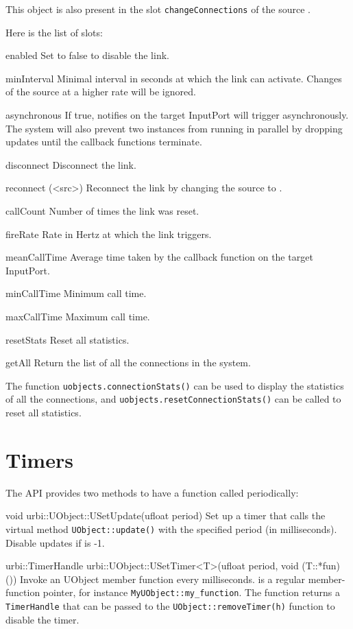 This object is also present in the slot \lstinline|changeConnections| of the
source \UVar.

Here is the list of  slots:

\begin{urbiscriptapi}
\item[enabled]
  Set to false to disable the link.
\item[minInterval]
  Minimal interval in seconds at which the link can activate. Changes of the
  source at a higher rate will be ignored.
\item[asynchronous]
  If true, notifies on the target InputPort will trigger asynchronously. The
  system will also prevent two instances from running in parallel by dropping
  updates until the callback functions terminate.
\item[disconnect]
  Disconnect the link.
\item[reconnect](<src>)
  Reconnect the link by changing the source to .
\item[callCount]
  Number of times the link was reset.
\item[fireRate]
  Rate in Hertz at which the link triggers.
\item[meanCallTime]
  Average time taken by the callback function on the target InputPort.
\item[minCallTime]
  Minimum call time.
\item[maxCallTime]
  Maximum call time.
\item[resetStats]
  Reset all statistics.
\item[getAll]
  Return the list of all the connections in the system.
\end{urbiscriptapi}


The function \lstinline|uobjects.connectionStats()| can be used to display
the statistics of all the connections, and
\lstinline|uobjects.resetConnectionStats()| can be called to reset all
statistics.

\section{Timers}
\label{sec:uob:timers}

The API provides two methods to have a function called periodically:
\begin{cxxapi}
\item[void urbi::UObject::USetUpdate(ufloat period)]
  Set up a timer that calls the virtual method
  \lstinline{UObject::update()} with the specified period (in
  milliseconds).  Disable updates if  is -1.

\item[urbi::TimerHandle urbi::UObject::USetTimer<T>(ufloat period, void (T::*fun)())]
  Invoke an UObject member function  every 
  milliseconds.   is a regular member-function pointer, for
  instance \lstinline|MyUObject::my_function|.
  The function returns a \lstinline|TimerHandle| that can be passed to the
  \lstinline|UObject::removeTimer(h)| function to disable the timer.
\end{cxxapi}

